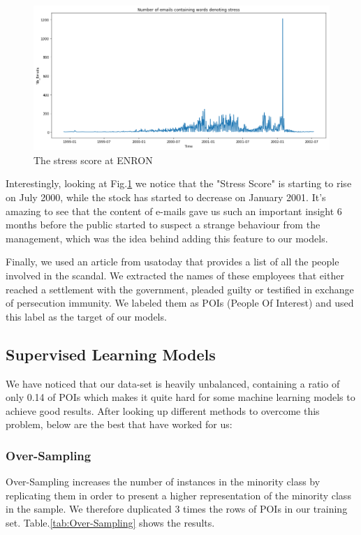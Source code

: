 \documentclass[11pt]{article}
\begin{document}
\vspace{-7mm}
\begin{figure}[htbp]
  \centering
  \includegraphics[width=\columnwidth]{images/stressscore.png}
  \vspace{-7mm}
  \caption{The stress score at ENRON}
  \vspace{-3mm}
  \label{fig:stressscore}
\end{figure}

Interestingly, looking at Fig.\ref{fig:stressscore} we notice that the "Stress Score" is starting to rise on July 2000, while the stock has started to decrease on January 2001. It's amazing to see that the content of e-mails gave us such an important insight 6 months before the public started to suspect a strange behaviour from the management, which was the idea behind adding this feature to our models.

Finally, we used an article from usatoday\cite{usatoday} that provides a list of all the people involved in the scandal. We extracted the names of these employees that either reached a settlement with the government, pleaded guilty or testified in exchange of persecution immunity. We labeled them as POIs (People Of Interest) and used this label as the target of our models.


\subsection{Supervised Learning Models}
We have noticed that our data-set is heavily unbalanced, containing a ratio of only 0.14 of POIs which makes it quite hard for some machine learning models to achieve good results. After looking up different methods\cite{analyticsvidhya} to overcome this problem, below are the best that have worked for us:
\subsubsection{Over-Sampling}
Over-Sampling increases the number of instances in the minority class by replicating them in order to present a higher representation of the minority class in the sample. We therefore duplicated 3 times the rows of POIs in our training set. Table.\ref{tab:Over-Sampling} shows the results.
\end{document}
